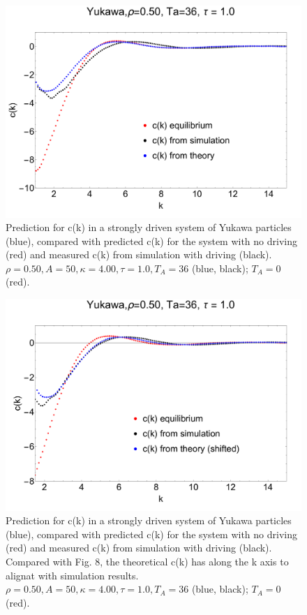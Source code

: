 \documentclass[amsmath,preprintnumbers,10pt,nofootinbib,prl,twocolumn]{revtex4-1}
\begin{document}
\begin{figure}
    \centering
    \includegraphics[scale=0.25, clip=True]{YukawaCk_Yp0.5_Pe6_U1.00.pdf}
    \caption{Prediction for c(k) in a strongly driven system of Yukawa particles (blue), compared with predicted c(k) for the system with no driving (red) and measured c(k) from simulation with driving (black). $\rho = 0.50, A = 50, \kappa = 4.00, \tau = 1.0, T_A = 36$ (blue, black); $T_A = 0$ (red).}
    \label{Fig:n}
\end{figure}

\begin{figure}
    \centering
    \includegraphics[scale=0.25, clip=True]{ShiftedYukawaCk_Yp0.5_Pe6_U1.00.pdf}
    \caption{Prediction for c(k) in a strongly driven system of Yukawa particles (blue), compared with predicted c(k) for the system with no driving (red) and measured c(k) from simulation with driving (black). Compared with Fig. 8, the theoretical c(k) has along the k axis to alignat with simulation results. $\rho = 0.50, A = 50, \kappa = 4.00, \tau = 1.0, T_A = 36$ (blue, black); $T_A = 0$ (red).}
    \label{Fig:n}
\end{figure}
\end{document}
